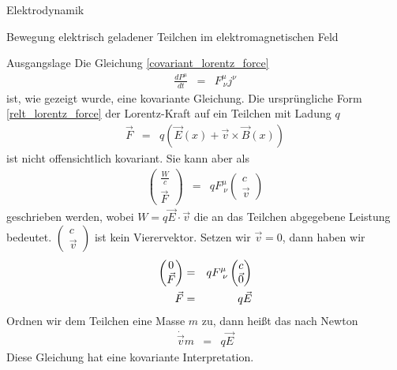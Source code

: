 \begin{chapter}{\titlestr}
\begin{section}{Elektrodynamik}
\begin{subsection}{Bewegung elektrisch geladener Teilchen im elektromagnetischen Feld}
\begin{subsubsection}{Ausgangslage}
Die Gleichung \ref{covariant_lorentz_force}
\begin{eqnarray*}
\frac{dP^\mu}{dt} &=& F^\mu_{\ \nu}j^\nu
\end{eqnarray*}
ist, wie gezeigt wurde, eine kovariante Gleichung. Die ursprüngliche Form \ref{relt_lorentz_force} der Lorentz-Kraft auf ein Teilchen mit Ladung $q$
\begin{eqnarray*}
\vec{F} &=& q\left(\vec{E}(x)+\vec{v}\times\vec{B}(x)\right)
\end{eqnarray*}
ist nicht offensichtlich kovariant. Sie kann aber als
\begin{eqnarray*}
\begin{pmatrix}
\frac{W}{c}\\
\vec{F}
\end{pmatrix} &=& qF^\mu_{\ \nu}\begin{pmatrix}
c\\
\vec{v}
\end{pmatrix}
\end{eqnarray*}
geschrieben werden, wobei $W=q\vec{E}\cdot\vec{v}$ die an das Teilchen abgegebene Leistung bedeutet.
$\begin{pmatrix}
c\\
\vec{v}
\end{pmatrix}$ ist kein Vierervektor. Setzen wir $\vec{v}=0$, dann haben wir
\begin{eqnarray}
\label{particlemotion_at_rest}
\begin{pmatrix}
0\\
\vec{F}
\end{pmatrix} &=& qF^\mu_{\ \nu}\begin{pmatrix}
c\\
\vec{0}
\end{pmatrix}\cr
\vec{F} &=& q\vec{E}
\end{eqnarray}
Ordnen wir dem Teilchen eine Masse $m$ zu, dann heißt das nach Newton
\begin{eqnarray*}
\dot{\vec{v}}m &=& q\vec{E}
\end{eqnarray*}
Diese Gleichung hat eine kovariante Interpretation.
\end{subsubsection}


\end{subsection}
\end{section}
\end{chapter}
